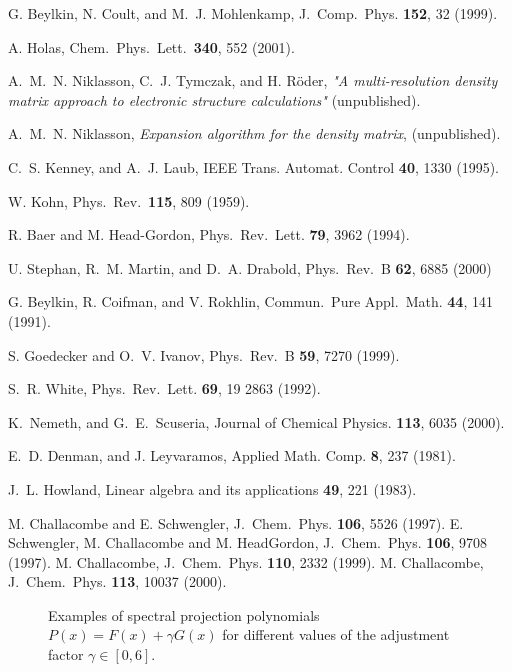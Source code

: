 \begin{references}
 G. Beylkin, N. Coult, and M.\ J. Mohlenkamp,
J.\ Comp.\ Phys. {\bf 152}, 32 (1999).

 A. Holas, Chem.\ Phys.\ Lett.\ {\bf 340}, 552 (2001).

 A.\ M.\ N. Niklasson, C.\ J. Tymczak, and H. R\"oder,
{\it "A multi-resolution density matrix approach to electronic structure
calculations"} (unpublished).

 A.\ M.\ N. Niklasson, {\it Expansion
algorithm for the density matrix}, (unpublished).

 C.\ S. Kenney, and A.\ J. Laub,
IEEE Trans. Automat. Control {\bf 40}, 1330 (1995).

 W. Kohn,
Phys.\ Rev.\ {\bf 115}, 809 (1959).

 R. Baer and M. Head-Gordon,
Phys.\ Rev.\ Lett. {\bf 79}, 3962 (1994).

 U. Stephan, R.\ M. Martin, and D.\ A. Drabold,
Phys.\ Rev.\ B {\bf 62}, 6885 (2000)

 G. Beylkin, R. Coifman, and V. Rokhlin,
Commun.\ Pure Appl.\ Math. {\bf 44}, 141 (1991).

 S. Goedecker and O.\ V. Ivanov,
Phys.\ Rev.\ B {\bf 59}, 7270 (1999).

 S.\ R. White,
Phys.\ Rev.\ Lett. {\bf 69}, 19 2863 (1992).

 K.\ Nemeth, and G.\ E.\ Scuseria,
Journal of Chemical Physics. {\bf 113}, 6035 (2000).

 E.\ D. Denman, and J. Leyvaramos,
Applied Math. Comp. {\bf 8}, 237 (1981).

 J.\ L. Howland,
Linear algebra and its applications {\bf 49}, 221 (1983).~

 M. Challacombe and E. Schwengler,
J.\ Chem.\ Phys. {\bf 106}, 5526 (1997).
E. Schwengler, M. Challacombe and M. HeadGordon,
J.\ Chem.\ Phys. {\bf 106}, 9708 (1997).
M. Challacombe, J.\ Chem.\ Phys. {\bf 110}, 2332 (1999).
M.  Challacombe, J.\ Chem.\ Phys. {\bf 113}, 10037 (2000).


\end{references}

\begin{figure}
\caption{\small
\label{Conv}}
\end{figure}

\begin{figure}
\caption{\small 
Examples of spectral projection polynomials $P(x) = F(x) + \gamma G(x)$
for different values of the adjustment factor $\gamma \in [0,6]$.
\label{Fig_F_G}}
\end{figure}

\begin{figure}
\caption{\small
\label{ConvN}}
\end{figure}

\begin{figure}
\caption{\small
\label{Lin}}
\end{figure}


